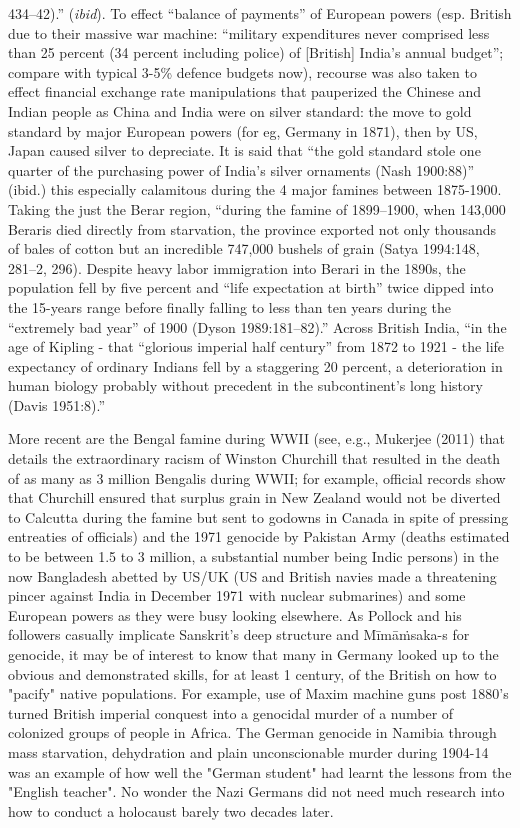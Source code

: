 434–42).” ({\sl ibid}). To effect “balance of payments” of European powers (esp. British due to their massive war machine: “military expenditures never comprised less than 25 percent (34 percent including police) of [British] India’s annual budget”; compare with typical 3-5\% defence budgets now), recourse was also taken to effect financial exchange rate manipulations that pauperized the Chinese and Indian people as China and India were on silver standard: the move to gold standard by major European powers (for eg, Germany in 1871), then by US, Japan caused silver to depreciate. It is said that “the gold standard stole one quarter of the purchasing power of India’s silver ornaments (Nash 1900:88)” (ibid.) this especially calamitous during the 4 major famines between 1875-1900. Taking the just the Berar region, “during the famine of 1899–1900, when 143,000 Beraris died directly from starvation, the province exported not only thousands of bales of cotton but an incredible 747,000 bushels of grain (Satya 1994:148, 281–2, 296). Despite heavy labor immigration into Berari in the 1890s, the population fell by five percent and “life expectation at birth” twice dipped into the 15-years range before finally falling to less than ten years during the “extremely bad year” of 1900 (Dyson 1989:181–82).” Across British India, “in the age of Kipling - that “glorious imperial half century” from 1872 to 1921 - the life expectancy of ordinary Indians fell by a staggering 20 percent, a deterioration in human biology probably without precedent in the subcontinent’s long history (Davis 1951:8).” 

More recent are the Bengal famine during WWII (see, e.g., Mukerjee (2011) that details the extraordinary racism of Winston Churchill that resulted in the death of as many as 3 million Bengalis during WWII; for example, official records show that Churchill ensured that surplus grain in New Zealand would not be diverted to Calcutta during the famine but sent to godowns in Canada in spite of pressing entreaties of officials) and the 1971 genocide by Pakistan Army (deaths estimated to be between 1.5 to 3 million, a substantial number being Indic persons) in the now Bangladesh abetted by US/UK (US and British navies made a threatening pincer against India in December 1971 with nuclear submarines) and some European powers as they were busy looking elsewhere. As Pollock and his followers casually implicate Sanskrit's deep structure and Mīmāṁsaka-s for genocide, it may be of interest to know that many in Germany looked up to the obvious and demonstrated skills, for at least 1 century, of the British on how to "pacify" native populations. For example, use of Maxim machine guns post 1880's turned British imperial conquest into a genocidal murder of a number of colonized groups of people in Africa. The German genocide in Namibia through mass starvation, dehydration and plain unconscionable murder during 1904-14 was an example of how well the "German student" had learnt the lessons from the "English teacher". No wonder the Nazi Germans did not need much research into how to conduct a holocaust barely two decades later.

